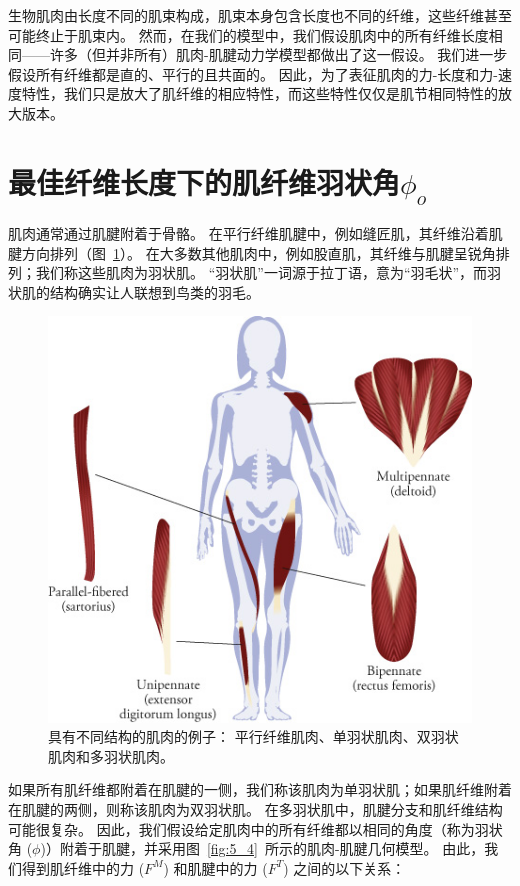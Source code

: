 生物肌肉由长度不同的肌束构成，肌束本身包含长度也不同的纤维，这些纤维甚至可能终止于肌束内。
然而，在我们的模型中，我们假设肌肉中的所有纤维长度相同——许多（但并非所有）肌肉-肌腱动力学模型都做出了这一假设。
我们进一步假设所有纤维都是直的、平行的且共面的。
因此，为了表征肌肉的力-长度和力-速度特性，我们只是放大了肌纤维的相应特性，而这些特性仅仅是肌节相同特性的放大版本。



\section{最佳纤维长度下的肌纤维羽状角$\phi_o$}

肌肉通常通过肌腱附着于骨骼。
在平行纤维肌腱中，例如缝匠肌，其纤维沿着肌腱方向排列（图~\ref{fig:5_3}）。
在大多数其他肌肉中，例如股直肌，其纤维与肌腱呈锐角排列；我们称这些肌肉为羽状肌。
“羽状肌”一词源于拉丁语，意为“羽毛状”，而羽状肌的结构确实让人联想到鸟类的羽毛。

\begin{figure}[!htb]
	\centering
	\includegraphics[width=0.8\linewidth]{chap5/5_3}
	\caption{具有不同结构的肌肉的例子：
		平行纤维肌肉、单羽状肌肉、双羽状肌肉和多羽状肌肉。 \label{fig:5_3}}
\end{figure}

如果所有肌纤维都附着在肌腱的一侧，我们称该肌肉为单羽状肌；如果肌纤维附着在肌腱的两侧，则称该肌肉为双羽状肌。
在多羽状肌中，肌腱分支和肌纤维结构可能很复杂。
因此，我们假设给定肌肉中的所有纤维都以相同的角度（称为羽状角 ($\phi$)）附着于肌腱，并采用图~\ref{fig:5_4}~所示的肌肉-肌腱几何模型。
由此，我们得到肌纤维中的力 ($F^M$) 和肌腱中的力 ($F^T$) 之间的以下关系：

